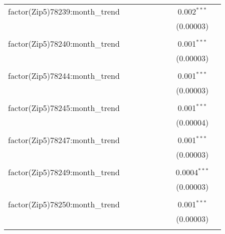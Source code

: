 \begin{table}[H]
{\begin{tabular}{@{\extracolsep{5pt}}lcccccccc}
  factor(Zip5)78239:month\_trend &  &  &  &  &  &  & 0.002$^{***}$ &  \\  

   &  &  &  &  &  &  & (0.00003) &  \\  

   & & & & & & & & \\  

  factor(Zip5)78240:month\_trend &  &  &  &  &  &  & 0.001$^{***}$ &  \\  

   &  &  &  &  &  &  & (0.00003) &  \\  

   & & & & & & & & \\  

  factor(Zip5)78244:month\_trend &  &  &  &  &  &  & 0.001$^{***}$ &  \\  

   &  &  &  &  &  &  & (0.00003) &  \\  

   & & & & & & & & \\  

  factor(Zip5)78245:month\_trend &  &  &  &  &  &  & 0.001$^{***}$ &  \\  

   &  &  &  &  &  &  & (0.00004) &  \\  

   & & & & & & & & \\  

  factor(Zip5)78247:month\_trend &  &  &  &  &  &  & 0.001$^{***}$ &  \\  

   &  &  &  &  &  &  & (0.00003) &  \\  

   & & & & & & & & \\  

  factor(Zip5)78249:month\_trend &  &  &  &  &  &  & 0.0004$^{***}$ &  \\  

   &  &  &  &  &  &  & (0.00003) &  \\  

   & & & & & & & & \\  

  factor(Zip5)78250:month\_trend &  &  &  &  &  &  & 0.001$^{***}$ &  \\  

   &  &  &  &  &  &  & (0.00003) &  \\  

   & & & & & & & & \\  


\end{tabular}}
\end{table}
